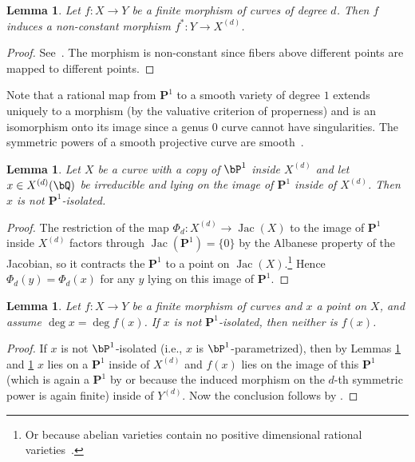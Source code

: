 \documentclass[11pt,reqno]{amsart}
\theoremstyle{plain}
\newtheorem{lemma}[theorem]{Lemma}
\theoremstyle{definition}
\newcommand{\Q}{\bQ}
\newcommand{\PP}{\mathbf P}
\newcommand{\Jac}{\operatorname{Jac}}
\begin{document}
\begin{lemma} \label{lem:map to Symd}
Let $f\colon X \to Y$ be a finite morphism of curves of degree $d$. Then $f$ induces a non-constant morphism $f^*\colon Y \to X^{(d)}$.
\end{lemma}
\begin{proof}
    See~\cite[Theorem~3.13]{MilneJV}. The morphism is non-constant since fibers above different points are mapped to different points.
\end{proof}

Note that a rational map from $\PP^1$ to a smooth variety of degree $1$ extends uniquely to a morphism (by the valuative criterion of properness) and is an isomorphism onto its image since a genus $0$ curve cannot have singularities. The symmetric powers of a smooth projective curve are smooth~\cite[Proposition~3.2]{MilneJV}.

\begin{lemma} \label{lem:iso1}
Let $X$ be a curve with a copy of $\bP^1$ inside $X^{(d)}$ and let $x\in X^{(d)}(\Q)$ be irreducible and lying on the image of $\PP^1$ inside of $X^{(d)}$. Then $x$ is not $\PP^1$-isolated.
\end{lemma}
\begin{proof}
The restriction of the map $\Phi_d:X^{(d)}\rightarrow \Jac (X)$ to the image of $\PP^1$ inside $X^{(d)}$ factors through $\Jac(\PP^1)=\{0 \}$ by the Albanese property of the Jacobian, so it contracts the $\PP^1$ to a point on $\Jac(X)$.\footnote{Or because abelian varieties contain no positive dimensional rational varieties~\cite[Corollary~3.9]{MilneAV}.} Hence $\Phi_d(y) = \Phi_d(x)$ for any $y$ lying on this image of $\PP^1$. 
\end{proof}

\begin{lemma} \label{lem:iso2}
Let $f: X\rightarrow Y$ be a finite morphism of curves and $x$ a point on $X$, and assume  $\deg x = \deg f(x)$. If $x$ is not $\PP^1$-isolated, then neither is $f(x)$.
\end{lemma}
\begin{proof}
If $x$ is not $\bP^1$-isolated (i.e., $x$ is $\bP^1$-parametrized), then 
by Lemmas \ref{lem:iso1} and \ref{lem:iso2} $x$ lies on a $\PP^1$ inside of $X^{(d)}$ and $f(x)$ lies on the image of this $\PP^1$ (which is again a $\PP^1$ by  or because the induced morphism on the $d$-th symmetric power is again finite) inside of $Y^{(d)}$. Now the conclusion follows by .
\end{proof}
\end{document}

